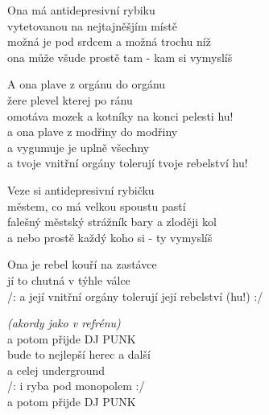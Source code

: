 
\ve{}
Ona má antidepresivní rybiku \\
vytetovanou na nejtajněšjím místě \\
možná je pod srdcem a možná trochu níž\\
ona může všude prostě tam - kam si vymyslíš
 
\cho{}
A ona plave z orgánu do orgánu\\
žere plevel kterej po ránu\\
omotáva mozek a kotníky na konci pelesti hu!\\
a ona plave z modřiny do modřiny \\
a vygumuje je uplně všechny\\
a tvoje vnitřní orgány tolerují tvoje rebelství hu!
 
\ve{}
Veze si antidepresivní rybičku\\
městem, co má velkou spoustu pastí\\
falešný městský strážník bary a zloději kol\\
a nebo prostě každý koho si - ty vymyslíš
 
\cho{}
Ona je rebel kouří na zastávce\\
jí to chutná v týhle válce\\
/: a její vnitřní orgány tolerují její rebelství (hu!) :/
 

\ve{} \textit{(akordy jako v refrénu) }\\
a potom přijde DJ PUNK\\
bude to nejlepší herec a další\\
a celej underground\\
/: i ryba pod monopolem :/ \\
a potom přijde DJ PUNK
 
\esong